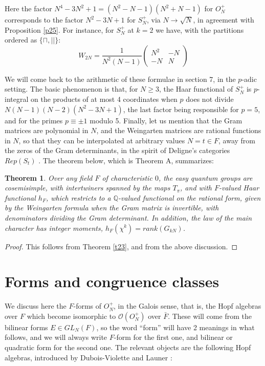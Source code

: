 \documentclass[11pt]{amsart}
\newtheorem{theorem}{Theorem}[section]
\theoremstyle{definition}
\begin{document}
Here the factor $N^4-3N^2+1=(N^2-N-1)(N^2+N-1)$ for $O_N^+$ corresponds to the factor $N^2-3N+1$ for $S_N^+$, via $N\to\sqrt N$, in agreement with Proposition \ref{p25}. For instance, for $S_N^+$ at $k=2$ we have, with the partitions ordered as $\{\sqcap,||\}$:
$$W_{2N}=\frac{1}{N^2(N-1)}\begin{pmatrix}N^2&-N\\-N&N\end{pmatrix}$$

We will come back to the arithmetic of these formulae in section 7, in the $p$-adic setting. The basic phenomenon is that, for $N\geq3$, the Haar functional of $S_N^+$ is $p$-integral on the products of at most 4 coordinates when $p$ does not divide $N(N-1)(N-2)(N^2-3N+1)$, the last factor being responsible for $p=5$, and for the primes $p\equiv\pm1$ modulo 5. Finally, let us mention that the Gram matrices are polynomial in $N$, and the Weingarten matrices are rational functions in $N$, so that they can be interpolated at arbitrary values $N=t\in F$, away from the zeros of the Gram determinants, in the spirit of Deligne's categories $Rep(S_t)$ \cite{del}. The theorem below, which is Theorem A, summarizes:

\begin{theorem}
\label{t26}
Over any field $F$ of characteristic $0$, the easy quantum groups are cosemisimple, with intertwiners spanned by the maps $T_\pi$, and with $F$-valued Haar functional $h_F$, which restricts to a $\mathbb Q$-valued functional on the rational form, given by the Weingarten formula when the Gram matrix is invertible, with denominators dividing the Gram determinant. In addition, the law of the main character has integer moments, $h_F(\chi^k)=rank(G_{kN})$.
\end{theorem}

\begin{proof}
This follows from Theorem \ref{t23}, and from the above discussion.
\end{proof}

\section{Forms and congruence classes}

We discuss here the $F$-forms of $O_N^+$, in the Galois sense, that is, the Hopf algebras over $F$ which become isomorphic to $\mathcal O(O_N^+)$ over $\bar F$. These will come from the bilinear forms $E\in GL_N(F)$, so the word ``form'' will have 2 meanings in what follows, and we will always write $F$-form for the first one, and bilinear or quadratic form for the second one. The relevant objects are the following Hopf algebras, introduced by Dubois-Violette and Launer \cite{dla}:
\end{document}
